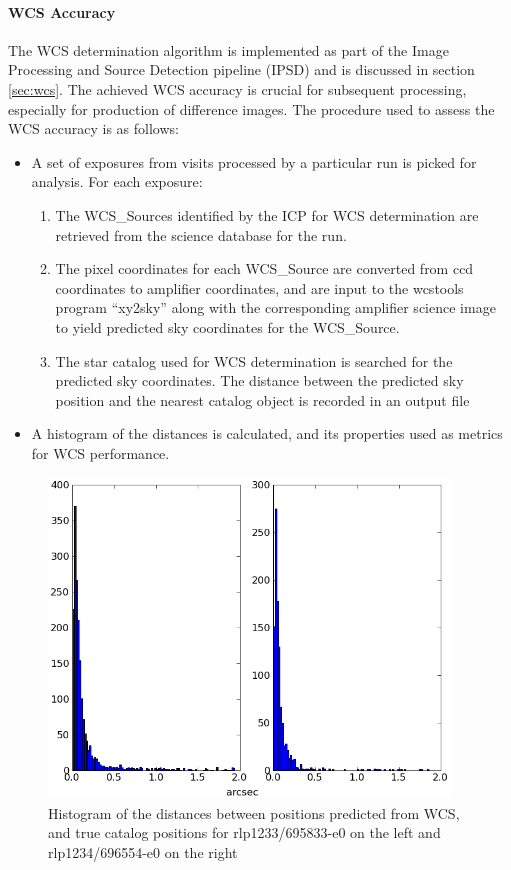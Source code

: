 \paragraph{WCS Accuracy}
The WCS determination algorithm is implemented as part of the Image
Processing and Source Detection pipeline (IPSD) and is discussed in
section \ref{sec:wcs}.  The achieved WCS accuracy is crucial for
subsequent processing, especially for production of difference images.
The procedure used to assess the WCS accuracy is as follows:
\begin{itemize}

\item A set of exposures from visits processed by a particular run is
  picked for analysis. For each exposure:
\begin{enumerate}
\item The WCS\_Sources identified by the ICP for WCS determination are retrieved from the
  science database for the run.
\item The pixel coordinates for each WCS\_Source are converted from
  ccd coordinates to amplifier coordinates, and are input to the
  wcstools program ``xy2sky'' along with the corresponding amplifier
  science image to yield predicted sky coordinates for the
  WCS\_Source.
\item The star catalog used for WCS determination is searched for the
  predicted sky coordinates.  The distance between the predicted sky
  position and the nearest catalog object is recorded in an output file
\end{enumerate}
\item A histogram of the distances is calculated, and its properties
  used as metrics for WCS performance.
\end{itemize}

\begin{figure}[p]
\begin{center}
\includegraphics[height=3.35in]{images/rlp1233_1234_match.png}
\caption{Histogram of the distances between positions predicted from WCS, and
  true catalog positions for rlp1233/695833-e0 on the left and
  rlp1234/696554-e0 on the right}  
\label{fig:wcs1}
\end{center}
\end{figure}


